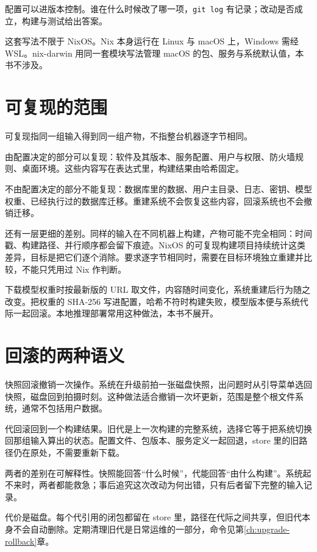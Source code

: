 配置可以进版本控制。谁在什么时候改了哪一项，\texttt{git log} 有记录；改动是否成立，构建与测试给出答案。

这套写法不限于 NixOS。Nix 本身运行在 Linux 与 macOS 上，Windows 需经 WSL。nix-darwin 用同一套模块写法管理 macOS 的包、服务与系统默认值，本书不涉及。

\section{可复现的范围}

可复现指同一组输入得到同一组产物，不指整台机器逐字节相同。

由配置决定的部分可以复现：软件及其版本、服务配置、用户与权限、防火墙规则、桌面环境。这些内容写在表达式里，构建结果由哈希固定。

不由配置决定的部分不能复现：数据库里的数据、用户主目录、日志、密钥、模型权重、已经执行过的数据库迁移。重建系统不会恢复这些内容，回滚系统也不会撤销迁移。

还有一层更细的差别。同样的输入在不同机器上构建，产物可能不完全相同：时间戳、构建路径、并行顺序都会留下痕迹。NixOS 的可复现构建项目持续统计这类差异，目标是把它们逐个消除。要求逐字节相同时，需要在目标环境独立重建并比较，不能只凭用过 Nix 作判断。

\begin{notebox}[模型权重也要固定]
下载模型权重时按最新版的 URL 取文件，内容随时间变化，系统重建后行为随之改变。把权重的 SHA-256 写进配置，哈希不符时构建失败，模型版本便与系统代际一起回滚。本地推理部署常用这种做法，本书不展开。
\end{notebox}

\section{回滚的两种语义}

快照回滚撤销一次操作。系统在升级前拍一张磁盘快照，出问题时从引导菜单选回快照，磁盘回到拍摄时刻。这种做法适合撤销一次坏更新，范围是整个根文件系统，通常不包括用户数据。

代回滚回到一个构建结果。旧代是上一次构建的完整系统，选择它等于把系统切换回那组输入算出的状态。配置文件、包版本、服务定义一起回退，store 里的旧路径仍在原处，不需要重新下载。

两者的差别在可解释性。快照能回答“什么时候”，代能回答“由什么构建”。系统起不来时，两者都能救急；事后追究这次改动为何出错，只有后者留下完整的输入记录。

代价是磁盘。每个代引用的闭包都留在 store 里，路径在代际之间共享，但旧代本身不会自动删除。定期清理旧代是日常运维的一部分，命令见第\ref{ch:upgrade-rollback}章。

